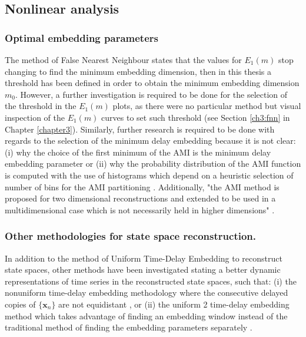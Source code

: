 \subsection*{Nonlinear analysis}

\subsubsection*{Optimal embedding parameters}
The method of False Nearest Neighbour \citep{Cao1997} states that the 
values for $E_1(m)$ stop changing to find the minimum embedding 
dimension, then in this thesis a threshold has been defined in 
order to obtain the minimum embedding dimension $m_0$. 
However, a further investigation is required to be done for the 
selection of the threshold in the $E_1(m)$ plots, 
as there were no particular method 
but visual inspection of the $E_1(m)$ curves to set such threshold 
(see Section \ref{ch3:fnn} in Chapter \ref{chapter3}).
Similarly, further research is required to be done with regards to the 
selection of the minimum delay embedding because it is not clear:
(i) why the choice of the first minimum of the AMI is the minimum delay 
embedding parameter \citep{kantz2003} or 
(ii) why the probability distribution of the AMI function 
is computed with the use of histograms which depend on a heuristic 
selection of number of bins for the AMI partitioning \citep{garcia2005e71}.
Additionally, "the AMI method is proposed for two dimensional 
reconstructions and extended to be used in a multidimensional case 
which is not necessarily held in higher dimensions" 
\citep[p. 156]{gomezgarcia2014}.

\subsubsection*{Other methodologies for state space reconstruction.}
In addition to the method of Uniform Time-Delay Embedding to reconstruct
state spaces, other methods have been investigated stating a better 
dynamic representations of time series in the reconstructed state spaces,
such that: 
(i) the nonuniform time-delay embedding methodology  
where the consecutive delayed copies of $\{ \boldsymbol{x}_n  \} $ are not
equidistant
\citep{pecora2007, uzal2011, 
Quintana-Duque2012, Quintana-Duque2013, Quintana-Duque2016}, or 
(ii) the uniform 2 time-delay embedding method which takes advantage 
of finding an embedding window instead of the traditional method 
of finding the embedding parameters separately \citep{gomezgarcia2014}.

